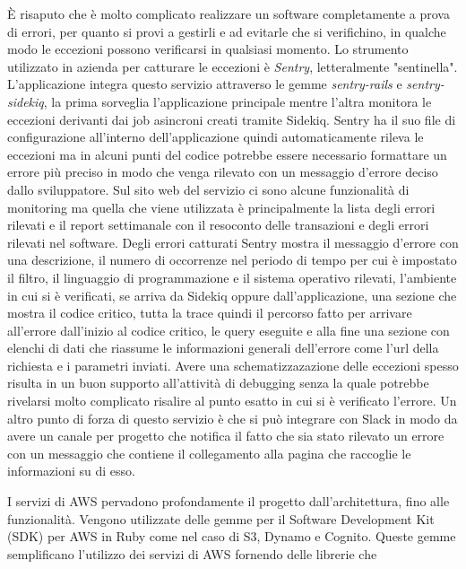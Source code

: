 \documentclass[target=bach,aauheader=,style=]{thud}
\begin{document}
\par È risaputo che è molto complicato realizzare un software completamente a prova di errori, per quanto si provi a gestirli e ad evitarle che si verifichino, in qualche
modo le eccezioni possono verificarsi in qualsiasi momento. Lo strumento utilizzato in azienda per catturare le eccezioni è \textit{Sentry}\cite{sentry}, letteralmente "sentinella".
L'applicazione integra questo servizio attraverso le gemme \textit{sentry-rails}\cite{sentry_rails_gem} e \textit{sentry-sidekiq}\cite{sentry_sidekiq_gem}, la prima
sorveglia l'applicazione principale mentre l'altra monitora le eccezioni derivanti dai job asincroni creati tramite Sidekiq.
Sentry ha il suo file di configurazione all'interno dell'applicazione quindi automaticamente rileva le eccezioni ma in alcuni punti del codice potrebbe essere necessario
formattare un errore più preciso in modo che venga rilevato con un messaggio d'errore deciso dallo sviluppatore.
Sul sito web del servizio ci sono alcune funzionalità di monitoring ma quella che viene utilizzata è principalmente la lista degli errori rilevati e il report
settimanale con il resoconto delle transazioni e degli errori rilevati nel software. Degli errori catturati Sentry mostra il messaggio d'errore con una descrizione,
il numero di occorrenze nel periodo di tempo per cui è impostato il filtro, il linguaggio di programmazione e il sistema operativo rilevati, l'ambiente in cui si è
verificati, se arriva da Sidekiq oppure dall'applicazione, una sezione che mostra il codice critico, tutta la trace quindi il percorso fatto per arrivare all'errore
dall'inizio al codice critico, le query eseguite e alla fine una sezione con elenchi di dati che riassume le informazioni generali dell'errore come l'url della richiesta
e i parametri inviati. Avere una schematizzazazione delle eccezioni spesso risulta in un buon supporto all'attività di debugging senza la quale potrebbe rivelarsi molto
complicato risalire al punto esatto in cui si è verificato l'errore. Un altro punto di forza di questo servizio è che si può integrare con Slack in modo da avere un canale per progetto che
notifica il fatto che sia stato rilevato un errore con un messaggio che contiene il collegamento alla pagina che raccoglie le informazioni su di esso.
\par I servizi di AWS pervadono profondamente il progetto dall'architettura, fino alle funzionalità. Vengono utilizzate delle gemme per il Software Development Kit (SDK)
per AWS\cite{aws_sdk_ruby} in Ruby come nel caso di S3, Dynamo e Cognito. Queste gemme semplificano l'utilizzo dei servizi di AWS fornendo delle librerie che
\end{document}
